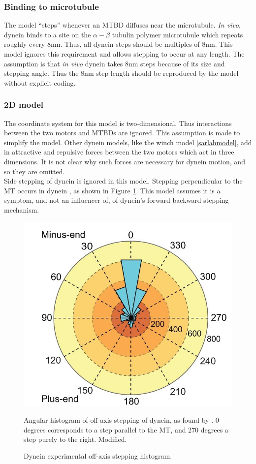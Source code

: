 \documentclass[10pt]{article} %
\begin{document}
\subsubsection{Binding to microtubule}
The model ``steps'' whenever an MTBD diffuses near the microtubule. \textit{In vivo}, dynein binds to a site on the $\alpha-\beta$ tubulin polymer microtubule which repeats roughly every 8nm. Thus, all dynein steps should be multiples of $8$nm. This model ignores this requirement and allows stepping to occur at any length. The assumption is that \textit{in vivo} dynein takes 8nm steps because of its size and stepping angle. Thus the 8nm step length should be reproduced by the model without explicit coding.\\

\subsubsection{2D model}
The coordinate system for this model is two-dimensional. Thus interactions between the two motors and MTBDs are ignored. This assumption is made to simplify the model. Other dynein models, like the winch model \ref{sarlahmodel}, add in attractive and repulsive forces between the two motors which act in three dimensions. It is not clear why such forces are necessary for dynein motion, and so they are omitted.\\

Side stepping of dynein is ignored in this model. Stepping perpendicular to the MT occurs in dynein \cite{weihongpaper}, as shown in Figure \ref{fig:weihong-side-stepping}. This model assumes it is a symptom, and not an influencer of, of dynein's forward-backward stepping mechanism.

\begin{figure}[h]
  \centering
  \includegraphics[width=.45\textwidth]{../../figures/weihong-side-stepping}
  \caption{Dynein experimental off-axis stepping histogram.}{Angular histogram of off-axis stepping of dynein, as found by \cite{weihongpaper}. 0 degrees corresponds to a step parallel to the MT, and 270 degrees a step purely to the right. Modified.}
  \label{fig:weihong-side-stepping}
\end{figure}
\end{document}
